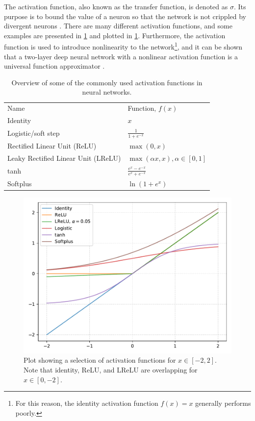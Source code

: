 The activation function, also known as the transfer function, is denoted as $\sigma$. Its purpose is to bound the value of a neuron so that the network is not crippled by divergent neurons \cite[81]{Wang2003}. There are many different activation functions, and some examples are presented in \cref{tab:activationfunctions} and plotted in \cref{fig:activationfunctions}. Furthermore, the activation function is used to introduce nonlinearity to the network\footnote{For this reason, the identity activation function $f(x)=x$ generally performs poorly.}, and it can be shown that a two-layer deep neural network with a nonlinear activation function is a universal function approximator \cite{Cybenko1989}. 

\begin{table}[htbp]
    \centering
    \caption[Activation functions]{Overview of some of the commonly used activation functions in neural networks. }
    \label{tab:activationfunctions}
    \begin{tabular}{ll}
    \hline
    Name & Function, $f(x)$ \\
    \hhline{==}
    Identity & $x$ \\
    Logistic/soft step & $\frac{1}{1+e^{-x}}$  \\
    Rectified Linear Unit (ReLU) & $\max\left(0, x\right)$ \\
    Leaky Rectified Linear Unit (LReLU) & $\max\left(\alpha x, x\right), \alpha\in[0,1]$ \\
    tanh & $\frac{e^x - e^{-x}}{e^x + e^{-x}}$ \\
    Softplus & $\ln\left(1+e^x\right)$ \\
    \hline
    \end{tabular}
\end{table}

\begin{figure}[htbp]  
    \centering
    \includegraphics[width=.8\textwidth]{figures/activationfunctions.pdf}
    \caption[Activation functions]{Plot showing a selection of activation functions for $x\in[-2,2]$. Note that identity, ReLU, and LReLU are overlapping for $x\in[0,-2]$. }
    \label{fig:activationfunctions}
\end{figure}

